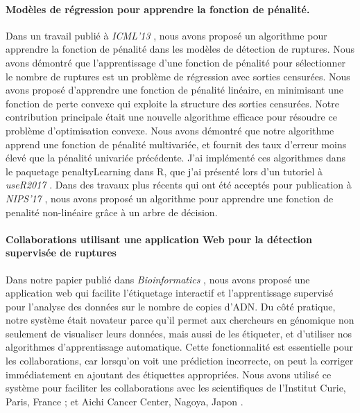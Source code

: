 \documentclass{article}
\begin{document}
\paragraph{Modèles de régression pour apprendre la fonction de pénalité.}

Dans un travail publié à \emph{ICML'13} \citep{HOCKING-penalties},
nous avons proposé un algorithme pour apprendre la fonction de
pénalité dans les modèles de détection de ruptures. Nous avons
démontré que l'apprentissage d'une fonction de pénalité pour
sélectionner le nombre de ruptures est un problème de régression avec
sorties censurées. Nous avons proposé d'apprendre une fonction de
pénalité linéaire, en minimisant une fonction de perte convexe qui
exploite la structure des sorties censurées. Notre contribution
principale était une nouvelle algorithme efficace pour résoudre ce
problème d'optimisation convexe. Nous avons démontré que notre
algorithme apprend une fonction de pénalité multivariée, et fournit
des taux d'erreur moins élevé que la pénalité univariée
précédente. J'ai implémenté ces algorithmes dans le paquetage
penaltyLearning dans R, que j'ai présenté lors d'un tutoriel à
\emph{useR2017} \citep{change-tutorial}. Dans des travaux plus récents
qui ont été acceptés pour publication à \emph{NIPS'17} \citep{MMIT},
nous avons proposé un algorithme pour apprendre une fonction de
penalité non-linéaire grâce à un arbre de décision.

\paragraph{Collaborations utilisant une application Web pour la
  détection supervisée de ruptures} Dans notre papier publié dans
\emph{Bioinformatics} \citep{hocking-SegAnnDB}, nous avons proposé une
application web qui facilite l'étiquetage interactif et
l'apprentissage supervisé pour l'analyse des données sur le nombre de
copies d'ADN. Du côté pratique, notre système était novateur parce
qu'il permet aux chercheurs en génomique non seulement de visualiser
leurs données, mais aussi de les étiqueter, et d'utiliser nos algorithmes d'apprentissage automatique. Cette fonctionnalité est
essentielle pour les collaborations, car lorsqu'on voit une prédiction
incorrecte, on peut la corriger immédiatement en ajoutant des
étiquettes appropriées. 
Nous avons utilisé ce système pour faciliter les
collaborations avec les scientifiques de l'Institut Curie, Paris,
France \citep{Chicard}; et Aichi Cancer Center, Nagoya, Japon
\citep{Hocking-Leukemia-2016,m14:clonal}.
\end{document}
